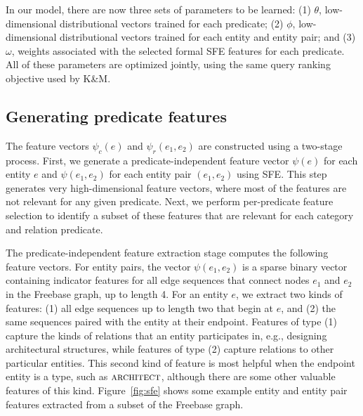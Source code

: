 \documentclass[11pt]{article}
\newcommand{\figref}[1]{Figure~\ref{fig:#1}}
\newcommand{\entity}[1]{\ensuremath{\textsc{#1}}}
\begin{document}
In our model, there are now three sets of parameters to be learned:
(1) $\theta$, low-dimensional distributional vectors trained for each
predicate; (2) $\phi$, low-dimensional distributional vectors trained
for each entity and entity pair; and (3) $\omega$, weights associated
with the selected formal SFE features for each predicate.  All of
these parameters are optimized jointly, using the same query ranking
objective used by K\&M.


\subsection{Generating predicate features}
\label{sec:feature-generation}

The feature vectors $\psi_c(e)$ and $\psi_r(e_1, e_2)$ are constructed
using a two-stage process. First, we generate a predicate-independent
feature vector $\psi(e)$ for each entity $e$ and $\psi(e_1, e_2)$ for
each entity pair $(e_1, e_2)$ using SFE. This step generates very
high-dimensional feature vectors, where most of the
features are not relevant for any given predicate. Next, we perform
per-predicate feature selection to identify a subset of these features
that are relevant for each category and relation predicate.

The predicate-independent feature extraction stage computes the
following feature vectors. For entity pairs, the vector $\psi(e_1,
e_2)$ is a sparse binary vector containing indicator features for all
edge sequences that connect nodes $e_1$ and $e_2$ in the Freebase
graph, up to length 4.  For an entity $e$, we extract two kinds of
features: (1) all edge sequences up to length two that begin at $e$,
and (2) the same sequences paired with the entity at their
endpoint. Features of type (1) capture the kinds of relations that an
entity participates in, e.g., designing architectural structures,
while features of type (2) capture relations to other particular
entities. This second kind of feature is most helpful when the
endpoint entity is a type, such as \entity{architect}, although there
are some other valuable features of this kind. \figref{sfe} shows some
example entity and entity pair features extracted from a subset of the
Freebase graph.
\end{document}
